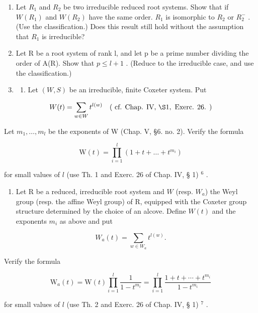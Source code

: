 \begin{enumerate}
\def\labelenumi{\arabic{enumi})}
\setcounter{enumi}{7}
\item
  Let \(R_{1}\) and \(R_{2}\) be two irreducible reduced root systems. Show that if \(W(R_{1})\) and \(W(R_{2})\) have the same order. \(R_{1}\) is isomorphic to \(R_{2}\) or \(R_{2}^{-}\) . (Use the classification.) Does this result still hold without the assumption that \(R_{1}\) is irreducible?
\item
  Let R be a root system of rank l, and let p be a prime number dividing the order of A(R). Show that \(p \leqslant l + 1\) . (Reduce to the irreducible case, and use the classification.)
\item
  \begin{enumerate}
  \def\labelenumii{\alph{enumii})}
  \tightlist
  \item
    Let \((W, S)\) be an irreducible, finite Coxeter system. Put
  \end{enumerate}
\end{enumerate}

\[
W (t) = \sum_ {w \in W} t ^ {l (w)} \quad (\text { cf.   Chap.   IV,   } \S 1, \text {   Exerc.   26. })
\]

Let \(m_{1},\ldots ,m_{l}\) be the exponents of W (Chap. V, §6. no. 2). Verify the formula

\[
\mathrm{W} (t) = \prod_ {i = 1} ^ {l} \left(1 + t + \dots + t ^ {m _ {i}}\right)
\]

for small values of \(l\) (use Th. 1 and Exerc. 26 of Chap. IV, § 1) \(^{6}\) .

\begin{enumerate}
\def\labelenumi{\alph{enumi})}
\setcounter{enumi}{1}
\tightlist
\item
  Let R be a reduced, irreducible root system and \(W\) (resp. \(W_{a}\)) the Weyl group (resp. the affine Weyl group) of R, equipped with the Coxeter group structure determined by the choice of an alcove. Define \(W(t)\) and the exponents \(m_{i}\) as above and put
\end{enumerate}

\[
W _ {a} (t) = \sum_ {w \in W _ {a}} t ^ {l (w)}.
\]

Verify the formula

\[
\mathrm{W} _ {a} (t) = \mathrm{W} (t) \prod_ {i = 1} ^ {l} \frac {1}{1 - t ^ {m _ {i}}} = \prod_ {i = 1} ^ {l} \frac {1 + t + \cdots + t ^ {m _ {i}}}{1 - t ^ {m _ {i}}}
\]

for small values of \(l\) (use Th. 2 and Exerc. 26 of Chap. IV, § 1) \(^{7}\) .

